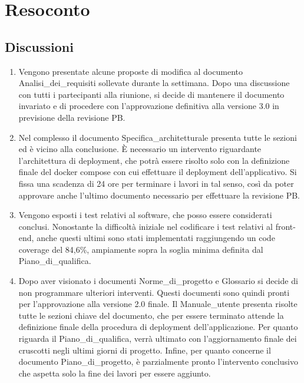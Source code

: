 \section{Resoconto} \label{sec:resoconto}
\subsection{Discussioni} \label{subsec:resdiscussione}
\begin{enumerate}
    \item Vengono presentate alcune proposte di modifica al documento Analisi\_dei\_requisiti sollevate durante la settimana. Dopo una discussione con tutti i partecipanti alla riunione, si decide di mantenere il documento invariato e di procedere con l'approvazione definitiva alla versione 3.0 in previsione della revisione PB.
    \item Nel complesso il documento Specifica\_architetturale presenta tutte le sezioni ed è vicino alla conclusione. È necessario un intervento riguardante l'architettura di deployment, che potrà essere risolto solo con la definizione finale del docker compose con cui effettuare il deployment dell'applicativo. Si fissa una scadenza di 24 ore per terminare i lavori in tal senso, così da poter approvare anche l'ultimo documento necessario per effettuare la revisione PB.
    \item Vengono esposti i test relativi al software, che posso essere considerati conclusi. Nonostante la difficoltà iniziale nel codificare i test relativi al front-end, anche questi ultimi sono stati implementati raggiungendo un code coverage del 84,6\%, ampiamente sopra la soglia minima definita dal Piano\_di\_qualifica.
    \item Dopo aver visionato i documenti Norme\_di\_progetto e Glossario si decide di non programmare ulteriori interventi. Questi documenti sono quindi pronti per l'approvazione alla versione 2.0 finale. Il Manuale\_utente presenta risolte tutte le sezioni chiave del documento, che per essere terminato attende la definizione finale della procedura di deployment dell'applicazione. Per quanto riguarda il Piano\_di\_qualifica, verrà ultimato con l'aggiornamento finale dei cruscotti negli ultimi giorni di progetto. Infine, per quanto concerne il documento Piano\_di\_progetto, è parzialmente pronto l'intervento conclusivo che aspetta solo la fine dei lavori per essere aggiunto.
\end{enumerate}
\newpage

